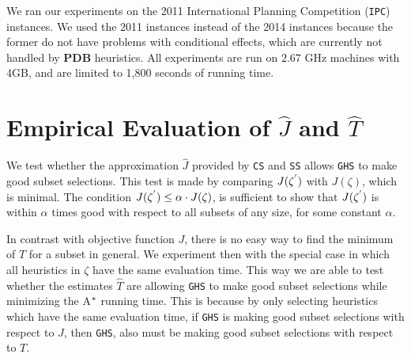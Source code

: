 We ran our experiments on the 2011 International Planning Competition (\texttt{IPC}) instances. We used the 2011 instances instead of the 2014 instances because the former do not have problems with conditional effects, which are currently not handled by \textbf{PDB} heuristics. All experiments are run on $2.67$ GHz machines with 4GB, and are limited to 1,800 seconds of running time.

\section{Empirical Evaluation of $\hat{J}$ and $\hat{T}$}
\noindent
We test whether the approximation $\hat{J}$ provided by \texttt{CS} and \texttt{SS} allows \texttt{GHS} to make good subset selections. This test is made by comparing $J(\zeta\sp{'})$ with $J(\zeta)$, which is minimal. The condition $J(\zeta\sp{'}) \leq \alpha \cdot J(\zeta)$, is sufficient to show that $J(\zeta\sp{'})$ is within $\alpha$ times good with respect to all subsets of any size, for some constant $\alpha$. 

In contrast with objective function $J$, there is no easy way to find the minimum of $T$ for a subset in general. We experiment then with the special case in which all heuristics in $\zeta$ have the same evaluation time. This way we are able to test whether the estimates $\hat{T}$ are allowing \texttt{GHS} to make good subset selections while minimizing the A$\sp{*}$ running time. This is because by only selecting heuristics which have the same evaluation time, if \texttt{GHS} is making good subset selections with respect to $J$, then \texttt{GHS}, also must be making good subset selections with respect to $T$.

